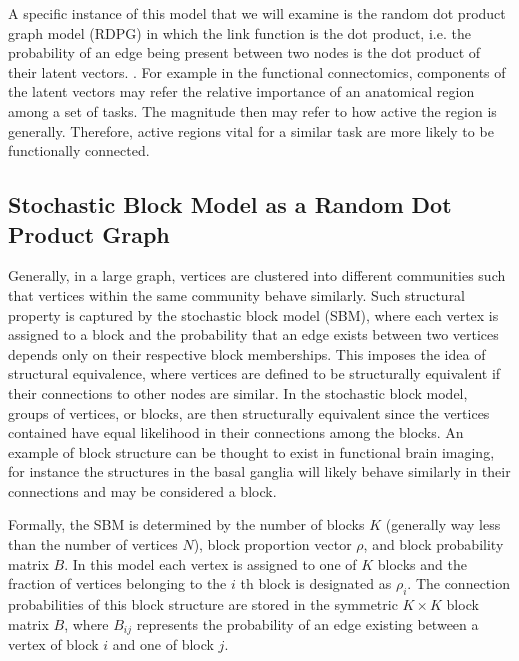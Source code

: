 A specific instance of this model that we will examine is the random dot product graph model (RDPG) in which the link function is the dot product, i.e. the probability of an edge being present between two nodes is the dot product of their latent vectors. \cite{scheinerman2010modeling}. For example in the functional connectomics, components of the latent vectors may refer the relative importance of an anatomical region among a set of tasks.  The magnitude then may refer to how active the region is generally.  Therefore, active regions vital for a similar task are more likely to be functionally connected.

\subsection{Stochastic Block Model as a Random Dot Product Graph}
Generally, in a large graph, vertices are clustered into different communities such that vertices within the same community behave similarly. Such structural property is captured by the stochastic block model (SBM), where each vertex is assigned to a block and the probability that an edge exists between two vertices depends only on their respective block memberships. This imposes the idea of structural equivalence, where vertices are defined to be structurally equivalent if their connections to other nodes are similar.  In the stochastic block model, groups of vertices, or blocks, are then structurally equivalent since the vertices contained have equal likelihood in their connections among the blocks.  An example of block structure can be thought to exist in functional brain imaging, for instance the structures in the basal ganglia will likely behave similarly in their connections and may be considered a block.

Formally, the SBM is determined by the number of blocks $K$ (generally way less than the number of vertices $N$), block proportion vector $\rho$, and block probability matrix $B$. In this model each vertex is assigned to one of $K$ blocks and the fraction of vertices belonging to the $i$ th block is designated as $\rho_i$.  The connection probabilities of this block structure are stored in the symmetric $K \times K$ block matrix $B$, where $B_{ij}$ represents the probability of an edge existing between a vertex of block $i$ and one of block $j$.


